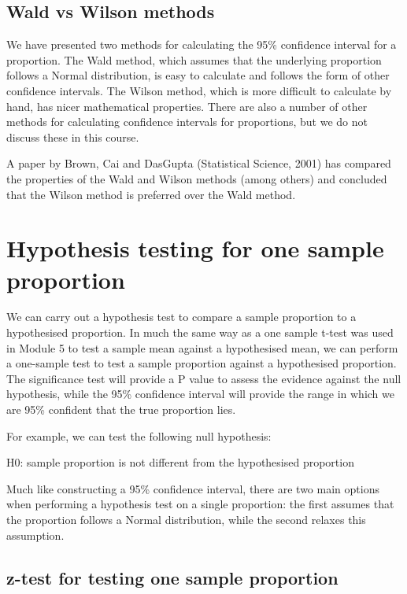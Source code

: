 \documentclass[
]{memoir}
\begin{document}
\hypertarget{wald-vs-wilson-methods}{%
\subsection{Wald vs Wilson methods}\label{wald-vs-wilson-methods}}

We have presented two methods for calculating the 95\% confidence interval for a proportion. The Wald method, which assumes that the underlying proportion follows a Normal distribution, is easy to calculate and follows the form of other confidence intervals. The Wilson method, which is more difficult to calculate by hand, has nicer mathematical properties. There are also a number of other methods for calculating confidence intervals for proportions, but we do not discuss these in this course.

A paper by Brown, Cai and DasGupta (Statistical Science, 2001) has compared the properties of the Wald and Wilson methods (among others) and concluded that the Wilson method is preferred over the Wald method.

\hypertarget{hypothesis-testing-for-one-sample-proportion}{%
\section{Hypothesis testing for one sample proportion}\label{hypothesis-testing-for-one-sample-proportion}}

We can carry out a hypothesis test to compare a sample proportion to a hypothesised proportion. In much the same way as a one sample t-test was used in Module 5 to test a sample mean against a hypothesised mean, we can perform a one-sample test to test a sample proportion against a hypothesised proportion. The significance test will provide a P value to assess the evidence against the null hypothesis, while the 95\% confidence interval will provide the range in which we are 95\% confident that the true proportion lies.

For example, we can test the following null hypothesis:

H0: sample proportion is not different from the hypothesised proportion

Much like constructing a 95\% confidence interval, there are two main options when performing a hypothesis test on a single proportion: the first assumes that the proportion follows a Normal distribution, while the second relaxes this assumption.

\hypertarget{z-test-for-testing-one-sample-proportion}{%
\subsection{z-test for testing one sample proportion}\label{z-test-for-testing-one-sample-proportion}}
\end{document}
